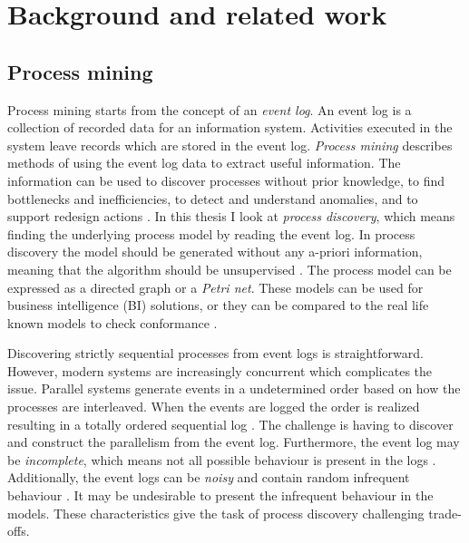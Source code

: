 
\clearpage
\section{Background and related work}
\label{sec:background}

\subsection{Process mining}

Process mining starts from the concept of an \emph{event log}.
An event log is a collection of recorded data for an information system.
Activities executed in the system leave records which are stored in the event log.
\emph{Process mining} describes methods of using the event log data to extract useful information.
The information can be used to discover processes without prior knowledge, to find bottlenecks and inefficiencies, to detect and understand anomalies, and to support redesign actions \cite{van2015extracting}.
In this thesis I look at \emph{process discovery}, which means finding the underlying process model
by reading the event log.
In process discovery the model should be generated without any a-priori information, meaning that the algorithm should be unsupervised \cite{van2013discovering}.
The process model can be expressed as a directed graph or a \emph{Petri net}.
These models can be used for business intelligence (BI) solutions, or they can be compared to the real life
known models to check conformance \cite{van2013discovering}.


Discovering strictly sequential processes from event logs is straightforward. However, modern systems are increasingly concurrent which complicates the issue. 
Parallel systems generate events in a undetermined order based on how the processes are interleaved. 
When the events are logged the order is realized resulting in a totally ordered sequential log \cite{van2004workflow}. 
The challenge is having to discover and construct the parallelism from the event log.
Furthermore, the event log may be \emph{incomplete}, which means not all possible behaviour is present in the logs \cite{van2013discovering}.
Additionally, the event logs can be \emph{noisy} and contain random infrequent behaviour \cite{van2013discovering}.
It may be undesirable to present the infrequent behaviour in the models.
These characteristics give the task of process discovery challenging trade-offs.

